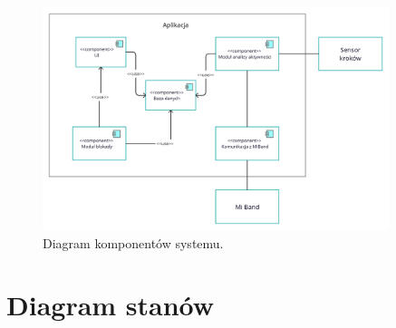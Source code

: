 \begin{figure}[H]
    \begin{center}
        \includegraphics[width=0.9\textwidth]{ComponentDiagram.png}
    \end{center}
    \caption{{\color{dgray}Diagram komponentów systemu.}} \label{component_diagram}
\end{figure}

\section{Diagram stanów}

